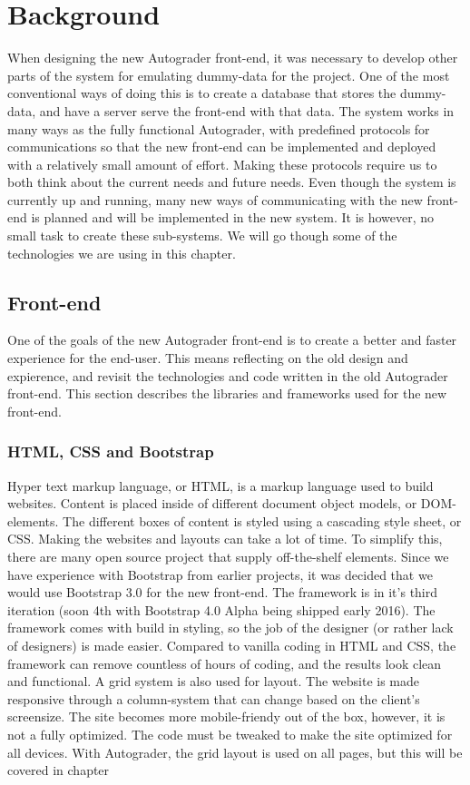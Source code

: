 \chapter{Background}
When designing the new Autograder front-end, it was necessary to develop other parts of the system for emulating dummy-data for the project. One of the most conventional ways of doing this is to create a database that stores the dummy-data, and have a server serve the front-end with that data. The system works in many ways as the fully functional Autograder, with predefined protocols for communications so that the new front-end can be implemented and deployed with a relatively small amount of effort. Making these protocols require us to both think about the current needs and future needs. Even though the system is currently up and running, many new ways of communicating with the new front-end is planned and will be implemented in the new system. It is however, no small task to create these sub-systems. We will go though some of the technologies we are using in this chapter.

\section{Front-end}
One of the goals of the new Autograder front-end is to create a better and faster experience for the end-user. This means reflecting on the old design and expierence, and revisit the technologies and code written in the old Autograder front-end. This section describes the libraries and frameworks used for the new front-end.

\subsection{HTML, CSS and Bootstrap}
Hyper text markup language, or HTML, is a markup language used to build websites. Content is placed inside of different document object models, or DOM-elements. The different boxes of content is styled using a cascading style sheet, or CSS. Making the websites and layouts can take a lot of time. To simplify this, there are many open source project that supply off-the-shelf elements. Since we have experience with Bootstrap from earlier projects, it was decided that we would use Bootstrap 3.0 for the new front-end. The framework is in it's third iteration (soon 4th with Bootstrap 4.0 Alpha being shipped early 2016). The framework comes with build in styling, so the job of the designer (or rather lack of designers) is made easier. Compared to vanilla coding in HTML and CSS, the framework can remove countless of hours of coding, and the results look clean and functional. A grid system is also used for layout. The website is made responsive through a column-system that can change based on the client's screensize. The site becomes more mobile-friendy out of the box, however, it is not a fully optimized. The code must be tweaked to make the site optimized for all devices. With Autograder, the grid layout is used on all pages, but this will be covered in chapter 

